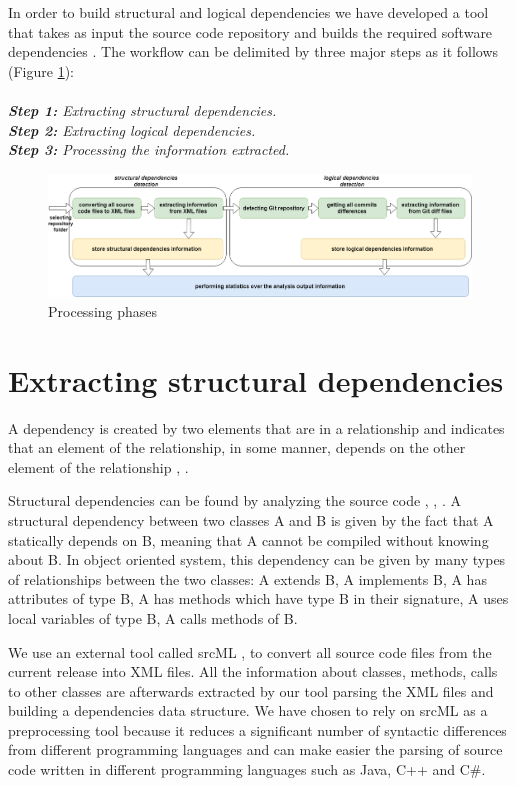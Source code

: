 \documentclass[12pt]{mitthesis}
\begin{document}
In order to build structural and logical dependencies we have developed a tool that takes as input the source code repository and builds the required software dependencies \cite{DepSACI}. The workflow can be delimited by three major steps as it follows (Figure \ref{fig:fig3}):\\ \\
\textit{\textbf{Step 1:} Extracting structural dependencies.}\\
\textit{\textbf{Step 2:} Extracting logical dependencies.}\\
\textit{\textbf{Step 3:} Processing the information extracted.}

\begin{figure}[H]
\centering
\includegraphics[width=\textwidth]{fig3.png}
\caption{Processing phases}
\label{fig:fig3}
\end{figure}



\section{Extracting structural dependencies}
\label{sec:sd_extraction}
A dependency is created by two elements that are in a relationship and indicates that an element of the relationship, in some manner, depends on the other element of the relationship \cite{Booch:2004:OAD:975416}, \cite{Cataldo2009SoftwareDW}.

Structural dependencies can be found by analyzing the source code \cite{Sangal:2005:UDM:1094811.1094824}, \cite{CalloArias2011}, \cite{structdep}. A structural dependency between two classes A and B is given by the fact that A statically depends on B, meaning that A cannot be compiled without knowing about B. In object oriented system, this dependency can be given by many types of relationships between the two classes: A extends B, A implements B, A has attributes of type B, A has methods which have type B in their signature, A uses local variables of type B, A calls methods of B.


 We use an external tool called srcML \cite{2003:XLC:851042.857028},
\cite{Collard:2011:LTF:2067850.2068011} to convert all source code files from the current release into XML files. All the information about classes, methods, calls to other classes are afterwards extracted by our tool parsing the XML files and building a dependencies data structure. We have chosen to rely on srcML as a preprocessing tool because it reduces a significant number of syntactic differences from different programming languages and can make easier the parsing of source code written in different programming languages such as Java, C++ and C\#.    
\end{document}
